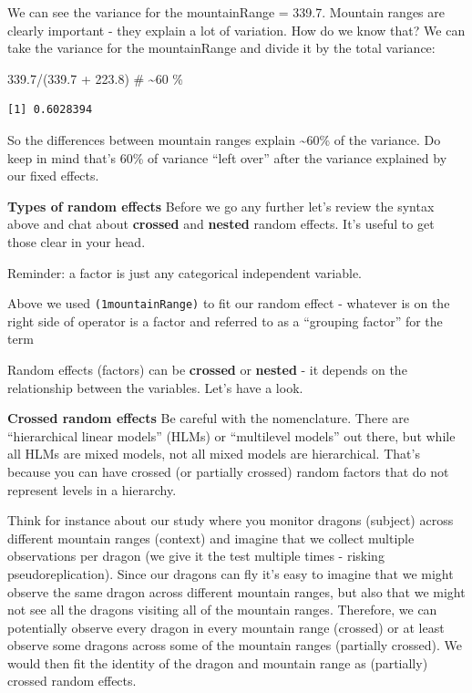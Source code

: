 \documentclass[
  letterpaper,
  DIV=11,
  numbers=noendperiod]{scrreprt}
\newenvironment{Shaded}{\begin{snugshade}}{\end{snugshade}}
\newcommand{\CommentTok}[1]{\textcolor[rgb]{0.37,0.37,0.37}{#1}}
\newcommand{\FloatTok}[1]{\textcolor[rgb]{0.68,0.00,0.00}{#1}}
\newcommand{\NormalTok}[1]{\textcolor[rgb]{0.00,0.23,0.31}{#1}}
\newcommand{\SpecialCharTok}[1]{\textcolor[rgb]{0.37,0.37,0.37}{#1}}
\begin{document}
We can see the variance for the mountainRange = 339.7. Mountain ranges
are clearly important - they explain a lot of variation. How do we know
that? We can take the variance for the mountainRange and divide it by
the total variance:

\begin{Shaded}
\begin{Highlighting}[]
\FloatTok{339.7}\SpecialCharTok{/}\NormalTok{(}\FloatTok{339.7} \SpecialCharTok{+} \FloatTok{223.8}\NormalTok{)  }\CommentTok{\# \textasciitilde{}60 \%}
\end{Highlighting}
\end{Shaded}

\begin{verbatim}
[1] 0.6028394
\end{verbatim}

So the differences between mountain ranges explain \textasciitilde60\%
of the variance. Do keep in mind that's 60\% of variance ``left over''
after the variance explained by our fixed effects.

\textbf{Types of random effects} Before we go any further let's review
the syntax above and chat about \textbf{crossed} and \textbf{nested}
random effects. It's useful to get those clear in your head.

Reminder: a factor is just any categorical independent variable.

Above we used \texttt{(1\textbar{}mountainRange)} to fit our random
effect - whatever is on the right side of \textbar{} operator is a
factor and referred to as a ``grouping factor'' for the term

Random effects (factors) can be \textbf{crossed} or \textbf{nested} - it
depends on the relationship between the variables. Let's have a look.

\textbf{Crossed random effects} Be careful with the nomenclature. There
are ``hierarchical linear models'' (HLMs) or ``multilevel models'' out
there, but while all HLMs are mixed models, not all mixed models are
hierarchical. That's because you can have crossed (or partially crossed)
random factors that do not represent levels in a hierarchy.

Think for instance about our study where you monitor dragons (subject)
across different mountain ranges (context) and imagine that we collect
multiple observations per dragon (we give it the test multiple times -
risking pseudoreplication). Since our dragons can fly it's easy to
imagine that we might observe the same dragon across different mountain
ranges, but also that we might not see all the dragons visiting all of
the mountain ranges. Therefore, we can potentially observe every dragon
in every mountain range (crossed) or at least observe some dragons
across some of the mountain ranges (partially crossed). We would then
fit the identity of the dragon and mountain range as (partially) crossed
random effects.
\end{document}
